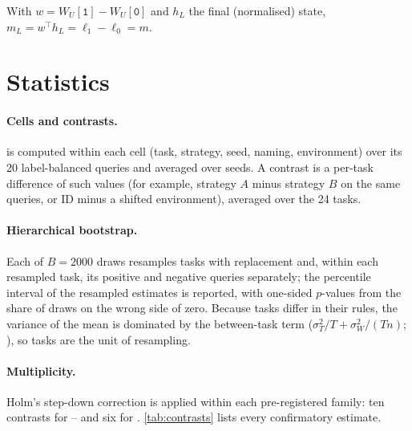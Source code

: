 \begin{lemma}
With $w = W_U[\texttt{1}] - W_U[\texttt{0}]$ and $h_L$ the final (normalised) state, $m_L = w^\top h_L = \ell_1 - \ell_0 = m$.
\end{lemma}

\section{Statistics}

\paragraph{Cells and contrasts.}
\AUROC is computed within each cell (task, strategy, seed, naming, environment) over its 20 label-balanced queries and averaged over seeds.
A contrast is a per-task difference of such values (for example, strategy $A$ minus strategy $B$ on the same queries, or ID minus a shifted environment), averaged over the 24 tasks.

\paragraph{Hierarchical bootstrap.}
Each of $B = 2000$ draws resamples tasks with replacement and, within each resampled task, its positive and negative queries separately; the percentile interval of the resampled estimates is reported, with one-sided $p$-values from the share of draws on the wrong side of zero.
Because tasks differ in their rules, the variance of the mean is dominated by the between-task term ($\sigma_T^2/T + \sigma_W^2/(Tn)$; \citealp{cochran1977sampling}), so tasks are the unit of resampling.

\paragraph{Multiplicity.}
Holm's step-down correction \citep{holm1979simple} is applied within each pre-registered family: ten contrasts for -- and six for \sata.
\autoref{tab:contrasts} lists every confirmatory estimate.

